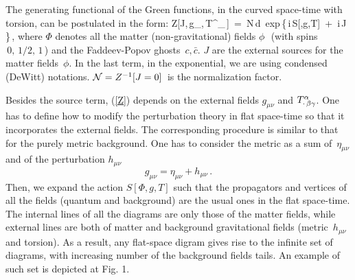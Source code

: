 The generating functional of the Green functions, in the 
curved space-time with torsion, can be postulated in the form:
\beq
Z[J,\,g_{\mu\nu},\,T^\al_{\cdot\,\be\ga}]
\,=\, {\cal N}\,\int d\Phi\,
{\rm exp}\,\left\{\,i\,S[\Phi,g,T] \,+\, i\phi\,J
\right\}\,,
\label{Z}
\eeq
where $\Phi$ denotes all the matter (non-gravitational) fields 
$\phi\,\,$ (with spins $\,0,\,1/2,\,1\,$) and the Faddeev-Popov ghosts 
$\,c,{\bar c}$. $J$ are the external sources for the matter 
fields $\,\phi$. In the last term, in the exponential, we are using 
condensed (DeWitt) notations.  ${\cal N}=Z^{-1}[J=0]\,$ 
is the normalization factor.

Besides the source term, (\ref{Z}) depends 
on the external fields $g_{\mu\nu}$ and $T^\alpha_{\cdot\,\beta\gamma}$. 
One has to define how to modify the 
perturbation theory in flat space-time so that it 
incorporates the external fields. The corresponding 
procedure is similar to that for the purely metric background.
One has to consider the metric as a sum of 
$\,\eta_{\mu\nu}\,$ and of the perturbation $h_{\mu\nu}$ 
$$
g_{\mu\nu}=\eta_{\mu\nu}+h_{\mu\nu}\,.
$$ 
Then, we 
expand the action $S[\Phi,g,T]$ such that the propagators 
and vertices of all the fields (quantum and background) are 
the usual ones in the flat space-time. The internal lines 
of all the diagrams are only those of the matter fields, 
while external lines 
are both of matter and background gravitational 
fields (metric $\,h_{\mu\nu}\,$ and torsion). As a result,
any flat-space digram gives rise to the infinite set of  
diagrams, with increasing number of the background fields
tails. An example of such set is depicted at Fig. 1. 

